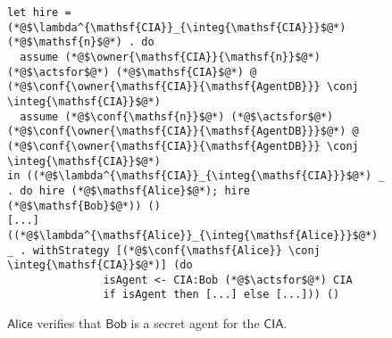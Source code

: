 \begin{figure}
\centering
\begin{lstlisting}
let hire = (*@$\lambda^{\mathsf{CIA}}_{\integ{\mathsf{CIA}}}$@*) (*@$\mathsf{n}$@*) . do
  assume (*@$\owner{\mathsf{CIA}}{\mathsf{n}}$@*) (*@$\actsfor$@*) (*@$\mathsf{CIA}$@*) @ (*@$\conf{\owner{\mathsf{CIA}}{\mathsf{AgentDB}}} \conj \integ{\mathsf{CIA}}$@*)
  assume (*@$\conf{\mathsf{n}}$@*) (*@$\actsfor$@*) (*@$\conf{\owner{\mathsf{CIA}}{\mathsf{AgentDB}}}$@*) @ (*@$\conf{\owner{\mathsf{CIA}}{\mathsf{AgentDB}}} \conj \integ{\mathsf{CIA}}$@*)
in ((*@$\lambda^{\mathsf{CIA}}_{\integ{\mathsf{CIA}}}$@*) _ . do hire (*@$\mathsf{Alice}$@*); hire (*@$\mathsf{Bob}$@*)) ()
[...]
((*@$\lambda^{\mathsf{Alice}}_{\integ{\mathsf{Alice}}}$@*) _ . withStrategy [(*@$\conf{\mathsf{Alice}} \conj \integ{\mathsf{CIA}}$@*)] (do
               isAgent <- CIA:Bob (*@$\actsfor$@*) CIA
               if isAgent then [...] else [...])) ()
\end{lstlisting}
\caption{$\mathsf{Alice}$ verifies that $\mathsf{Bob}$ is a secret agent for the $\mathsf{CIA}$.}
\label{fig:govt-alice-checks-bob}
\end{figure}